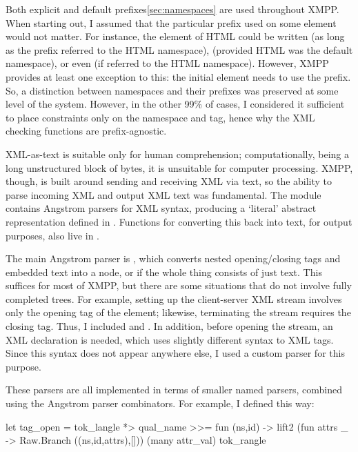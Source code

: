 \documentclass[12pt,a4paper,twoside,openright]{report}
\begin{document}
{Both explicit and default prefixes\ref{sec:namespaces} are used throughout XMPP. When starting out, I assumed that the particular prefix used on some element would not matter. For instance, the  element of HTML could be written  (as long as the  prefix referred to the HTML namespace),  (provided HTML was the default namespace), or even  (if  referred to the HTML namespace). However, XMPP provides at least one exception to this: the initial  element needs to use the  prefix. So, a distinction between namespaces and their prefixes was preserved at some level of the system. However, in the other 99\% of cases, I considered it sufficient to place constraints only on the namespace and tag, hence why the XML checking functions are prefix-agnostic.

XML-as-text is suitable only for human comprehension; computationally, being a long unstructured block of bytes, it is unsuitable for computer processing. XMPP, though, is built around sending and receiving XML via text, so the ability to parse incoming XML and output XML text was fundamental. The  module contains Angstrom parsers for XML syntax, producing a `literal' abstract representation defined in . Functions for converting this back into text, for output purposes, also live in .

The main Angstrom parser is , which converts nested opening/closing tags and embedded text into a  node, or  if the whole thing consists of just text. This suffices for most of XMPP, but there are some situations that do not involve fully completed trees. For example, setting up the client-server XML stream involves only the opening tag of the  element; likewise, terminating the stream requires the closing tag. Thus, I included  and . In addition, before opening the stream, an XML declaration  is needed, which uses slightly different syntax to XML tags. Since this syntax does not appear anywhere else, I used a custom parser for this purpose.

These parsers are all implemented in terms of smaller named parsers, combined using the Angstrom parser combinators. For example, I defined  this way:

\begin{ocaml}
let tag_open =
  tok_langle *> qual_name >>= fun (ns,id) ->
    lift2 (fun attrs _ -> Raw.Branch ((ns,id,attrs),[]))
      (many attr_val)
      tok_rangle
\end{ocaml}

}
\end{document}
